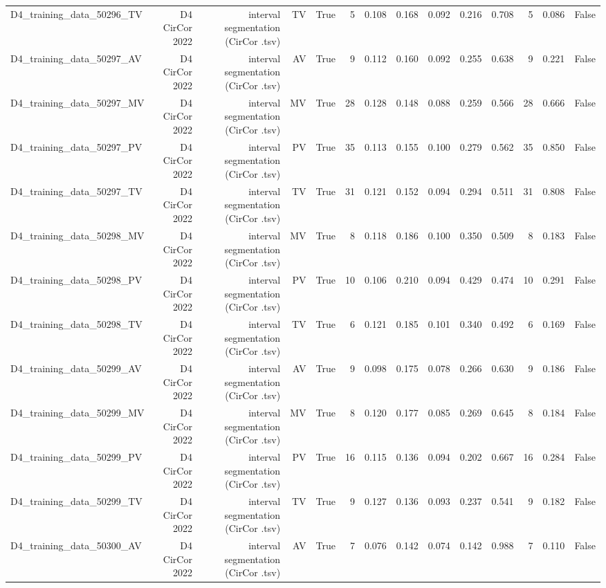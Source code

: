 \begin{table}[htbp]
\begin{tabular}{lrrrrrrrrrrrrr}
    D4\_training\_data\_50296\_TV & D4 CirCor 2022 & interval segmentation (CirCor .tsv) & TV & True & 5 & 0.108 & 0.168 & 0.092 & 0.216 & 0.708 & 5 & 0.086 & False \\
    D4\_training\_data\_50297\_AV & D4 CirCor 2022 & interval segmentation (CirCor .tsv) & AV & True & 9 & 0.112 & 0.160 & 0.092 & 0.255 & 0.638 & 9 & 0.221 & False \\
    D4\_training\_data\_50297\_MV & D4 CirCor 2022 & interval segmentation (CirCor .tsv) & MV & True & 28 & 0.128 & 0.148 & 0.088 & 0.259 & 0.566 & 28 & 0.666 & False \\
    D4\_training\_data\_50297\_PV & D4 CirCor 2022 & interval segmentation (CirCor .tsv) & PV & True & 35 & 0.113 & 0.155 & 0.100 & 0.279 & 0.562 & 35 & 0.850 & False \\
    D4\_training\_data\_50297\_TV & D4 CirCor 2022 & interval segmentation (CirCor .tsv) & TV & True & 31 & 0.121 & 0.152 & 0.094 & 0.294 & 0.511 & 31 & 0.808 & False \\
    D4\_training\_data\_50298\_MV & D4 CirCor 2022 & interval segmentation (CirCor .tsv) & MV & True & 8 & 0.118 & 0.186 & 0.100 & 0.350 & 0.509 & 8 & 0.183 & False \\
    D4\_training\_data\_50298\_PV & D4 CirCor 2022 & interval segmentation (CirCor .tsv) & PV & True & 10 & 0.106 & 0.210 & 0.094 & 0.429 & 0.474 & 10 & 0.291 & False \\
    D4\_training\_data\_50298\_TV & D4 CirCor 2022 & interval segmentation (CirCor .tsv) & TV & True & 6 & 0.121 & 0.185 & 0.101 & 0.340 & 0.492 & 6 & 0.169 & False \\
    D4\_training\_data\_50299\_AV & D4 CirCor 2022 & interval segmentation (CirCor .tsv) & AV & True & 9 & 0.098 & 0.175 & 0.078 & 0.266 & 0.630 & 9 & 0.186 & False \\
    D4\_training\_data\_50299\_MV & D4 CirCor 2022 & interval segmentation (CirCor .tsv) & MV & True & 8 & 0.120 & 0.177 & 0.085 & 0.269 & 0.645 & 8 & 0.184 & False \\
    D4\_training\_data\_50299\_PV & D4 CirCor 2022 & interval segmentation (CirCor .tsv) & PV & True & 16 & 0.115 & 0.136 & 0.094 & 0.202 & 0.667 & 16 & 0.284 & False \\
    D4\_training\_data\_50299\_TV & D4 CirCor 2022 & interval segmentation (CirCor .tsv) & TV & True & 9 & 0.127 & 0.136 & 0.093 & 0.237 & 0.541 & 9 & 0.182 & False \\
    D4\_training\_data\_50300\_AV & D4 CirCor 2022 & interval segmentation (CirCor .tsv) & AV & True & 7 & 0.076 & 0.142 & 0.074 & 0.142 & 0.988 & 7 & 0.110 & False \\

\end{tabular}
\end{table}

